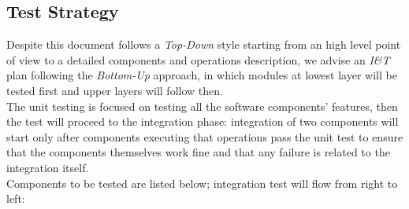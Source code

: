 \documentclass[a4paper]{article}
\begin{document}
\subsection{Test Strategy}
Despite this document follows a \textit{Top-Down} style starting from an high level point of view to a detailed components and operations description, we advise an \textit{I\&T} plan following the \textit{Bottom-Up} approach, in which modules at lowest layer will be tested first and upper layers will follow then.\\

The unit testing is focused on testing all the software components' features, then the test will proceed to the integration phase: integration of two components will start only after components executing that operations pass the unit test to ensure that the components themselves work fine and that any failure is related to the integration itself.\\

Components to be tested are listed below; integration test will flow from right to left:
\end{document}
